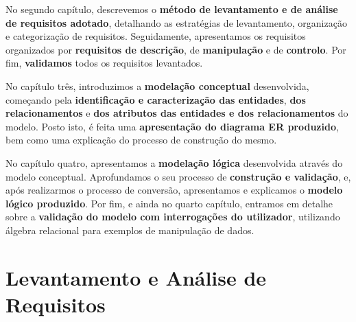 \documentclass[a4paper,12pt]{scrreprt}
\begin{document}
    No segundo capítulo, descrevemos o \textbf{método de levantamento e de análise de requisitos adotado}, detalhando as estratégias de levantamento, organização e categorização de requisitos. Seguidamente, apresentamos os requisitos organizados por \textbf{requisitos de descrição}, de \textbf{manipulação} e de \textbf{controlo}. Por fim, \textbf{validamos} todos os requisitos levantados.

    No capítulo três, introduzimos a \textbf{modelação conceptual} desenvolvida, começando pela \textbf{identificação e caracterização das entidades}, \textbf{dos relacionamentos} e \textbf{dos atributos das entidades e dos relacionamentos} do modelo. Posto isto, é feita uma \textbf{apresentação do diagrama ER produzido}, bem como uma explicação do processo de construção do mesmo.

    No capítulo quatro, apresentamos a \textbf{modelação lógica} desenvolvida através do modelo conceptual. Aprofundamos o seu processo de \textbf{construção e validação}, e, após realizarmos o processo de conversão, apresentamos e explicamos o \textbf{modelo lógico produzido}.
    Por fim, e ainda no quarto capítulo, entramos em detalhe sobre a \textbf{validação do modelo com interrogações do utilizador}, utilizando álgebra relacional para exemplos de manipulação de dados.



\chapter{Levantamento e Análise de Requisitos}
    \label{requisitos}
\end{document}
